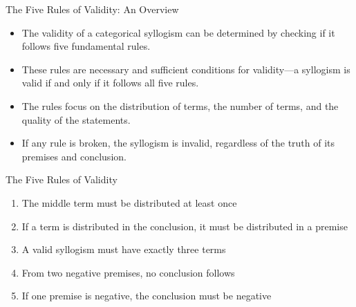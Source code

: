 \documentclass{beamer}
\begin{document}
	\begin{frame}{The Five Rules of Validity: An Overview}
		\begin{itemize}
			\item The validity of a categorical syllogism can be determined by checking if it follows five fundamental rules.
			\item These rules are necessary and sufficient conditions for validity—a syllogism is valid if and only if it follows all five rules.
			\item The rules focus on the distribution of terms, the number of terms, and the quality of the statements.
			\item If any rule is broken, the syllogism is invalid, regardless of the truth of its premises and conclusion.
		\end{itemize}
		
		\begin{block}{The Five Rules of Validity}
			\scriptsize
			\begin{enumerate}
				\item The middle term must be distributed at least once
				\item If a term is distributed in the conclusion, it must be distributed in a premise
				\item A valid syllogism must have exactly three terms
				\item From two negative premises, no conclusion follows
				\item If one premise is negative, the conclusion must be negative
			\end{enumerate}
		\end{block}
	\end{frame}
	
\end{document}
